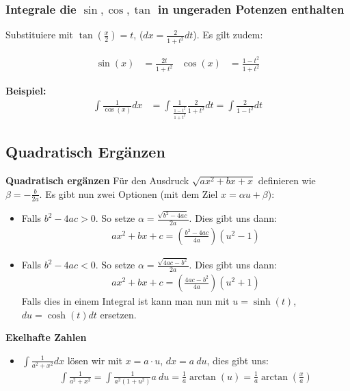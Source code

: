 \documentclass[25pt]{sciposter}
\newenvironment{method}[1]{\begin{mdframed}[backgroundcolor=blue!10,innertopmargin=15pt, innerbottommargin=15pt, nobreak=true]
		\textbf{#1 }
	}
	{ 
	\end{mdframed}
}
\begin{document}
\begin{multicols}{3}
\subsubsection*{Integrale die $\sin, \cos, \tan$ in ungeraden Potenzen enthalten}
Substituiere mit $\tan(\frac{x}{2}) = t$, ($dx = \frac{2}{1+t^2} dt$). Es gilt zudem:

\begin{align*}
\sin(x) &= \frac{2t}{1+t^2} & \cos(x) &= \frac{1-t^2}{1+t^2}
\end{align*}

\textbf{Beispiel:}
\begin{align*}
	\int \frac{1}{\cos(x)} dx &= \int \frac{1}{\frac{1-t^2}{1+t^2}} \frac{2}{1+t^2} dt = \int \frac{2}{1-t^2} dt
\end{align*}

\subsection*{Quadratisch Ergänzen}
\begin{method}{Quadratisch ergänzen} Für den Ausdruck $\sqrt{ax^2 + bx + x}$ definieren wie $\beta = - \frac{b}{2a}$. Es gibt nun zwei Optionen (mit dem Ziel $x= \alpha u + \beta$):

\begin{itemize}
	\item Falls $b^2 - 4ac > 0$. So setze $\alpha = \frac{\sqrt{b^2 - 4ac}}{2a}$. Dies gibt uns dann:
	\begin{align*}
		ax^2 + bx + c = \left(\frac{b^2 -4ac}{4a}\right)\left(u^2 - 1\right)
	\end{align*}
	
	\item Falls $b^2 - 4ac < 0$. So setze $\alpha = \frac{\sqrt{4ac - b^2}}{2a}$. Dies gibt uns dann:
	\begin{align*}
	ax^2 + bx + c = \left(\frac{4ac - b^2}{4a}\right)\left(u^2 + 1\right)
	\end{align*}
	Falls dies in einem Integral ist kann man nun mit $u=\sinh(t)$, $du = \cosh(t) dt$ ersetzen.
\end{itemize}

\end{method}

\begin{method}{Ekelhafte Zahlen}
	
	\begin{itemize}
	\item $\int \frac{1}{a^2 + x^2} dx$ lösen wir mit $x=a\cdot u$, $dx = a \ du$, dies gibt uns:
	\begin{align*}
		\int \frac{1}{a^2 + x^2} = \int\frac{1}{a^2 (1 + u^2)} a \ du = \frac{1}{a} \arctan(u) = \frac{1}{a} \arctan\left(\frac{x}{a}\right)
	\end{align*}
	

\end{itemize}
\end{method}
\end{multicols}
\end{document}
